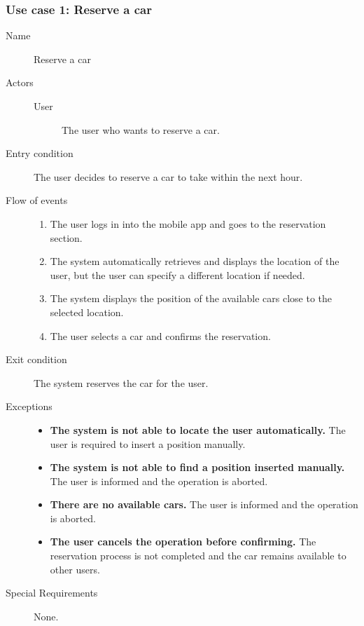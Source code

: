 	\subsubsection{Use case 1: Reserve a car}
		\begin{description}
			\item[Name] Reserve a car
			\item[Actors] \hfill
				\begin{description}
					\item[User] The user who wants to reserve a car.
				\end{description}
			\item[Entry condition] The user decides to reserve a car to take within the next hour.
			\item[Flow of events] \hfill
				\begin{enumerate}
					\item The user logs in into the mobile app and goes to the reservation section. \item The system automatically retrieves and displays the location of the user, but the user can specify a different location if needed.
					\item The system displays the position of the available cars close to the selected location.
					\item The user selects a car and confirms the reservation.
				\end{enumerate}
			\item[Exit condition] The system reserves the car for the user.
			\item[Exceptions] \hfill
				\begin{itemize}
					\item \textbf{The system is not able to locate the user automatically.} The user is required to insert a position manually.
					\item \textbf{The system is not able to find a position inserted manually.} The user is informed and the operation is aborted.
					\item \textbf{There are no available cars.} The user is informed and the operation is aborted.
					\item \textbf{The user cancels the operation before confirming.} The reservation process is not completed and the car remains available to other users.
				\end{itemize}
			\item[Special Requirements] None.
		\end{description}

